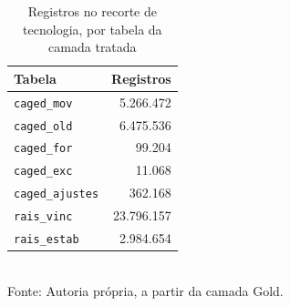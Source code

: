 \begin{table}[htbp]
    \centering
    \caption{Registros no recorte de tecnologia, por tabela da camada tratada}
    \label{tab:linhas-camada}
    \footnotesize
    \renewcommand{\arraystretch}{1.25}
    \begin{tabular}{lr}
        \toprule
        \rowcolor{black!8}
        \textbf{Tabela} & \textbf{Registros} \\
        \midrule
        \texttt{caged\_mov} & 5.266.472 \\
        \texttt{caged\_old} & 6.475.536 \\
        \texttt{caged\_for} & 99.204 \\
        \texttt{caged\_exc} & 11.068 \\
        \texttt{caged\_ajustes} & 362.168 \\
        \texttt{rais\_vinc} & 23.796.157 \\
        \texttt{rais\_estab} & 2.984.654 \\
        \bottomrule
    \end{tabular}
    \\[4pt]
    Fonte: Autoria própria, a partir da camada Gold.
\end{table}
